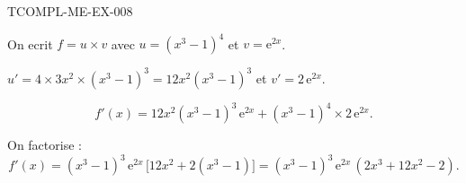 \begin{corrige}{TCOMPL-ME-EX-008}

On ecrit $f = u \times v$ avec $u = (x^3-1)^4$ et $v = \mathrm{e}^{2x}$.


$u' = 4 \times 3x^2 \times (x^3-1)^3 = 12x^2(x^3-1)^3$ et $v' = 2\,\mathrm{e}^{2x}$.

\[ f'(x) = 12x^2(x^3-1)^3\,\mathrm{e}^{2x} + (x^3-1)^4 \times 2\,\mathrm{e}^{2x}. \]

On factorise :
\[ f'(x) = (x^3-1)^3\,\mathrm{e}^{2x}\,\bigl[12x^2 + 2(x^3-1)\bigr] = (x^3-1)^3\,\mathrm{e}^{2x}\,(2x^3+12x^2-2). \]

\end{corrige}

